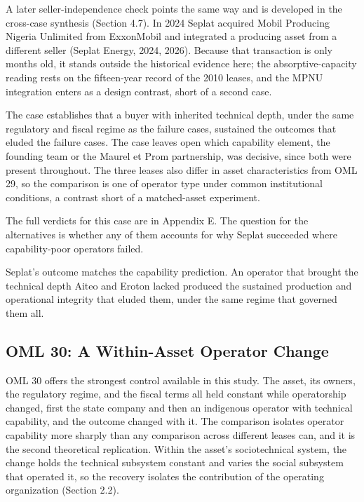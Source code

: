 A later seller-independence check points the same way and is developed
in the cross-case synthesis (Section 4.7). In 2024 Seplat acquired Mobil
Producing Nigeria Unlimited from ExxonMobil and integrated a producing
asset from a different seller (Seplat Energy, 2024, 2026). Because that
transaction is only months old, it stands outside the historical
evidence here; the absorptive-capacity reading rests on the fifteen-year
record of the 2010 leases, and the MPNU integration enters as a design
contrast, short of a second case.

The case establishes that a buyer with inherited technical depth, under
the same regulatory and fiscal regime as the failure cases, sustained
the outcomes that eluded the failure cases. The case leaves open which
capability element, the founding team or the Maurel et Prom partnership,
was decisive, since both were present throughout. The three leases also
differ in asset characteristics from OML 29, so the comparison is one of
operator type under common institutional conditions, a contrast short of
a matched-asset experiment.

The full verdicts for this case are in Appendix E. The question for the
alternatives is whether any of them accounts for why Seplat succeeded
where capability-poor operators failed.

Seplat's outcome matches the capability prediction. An operator that
brought the technical depth Aiteo and Eroton lacked produced the
sustained production and operational integrity that eluded them, under
the same regime that governed them all.

\hypertarget{oml-30-a-within-asset-operator-change}{%
\subsection{OML 30: A Within-Asset Operator
Change}\label{oml-30-a-within-asset-operator-change}}

OML 30 offers the strongest control available in this study. The asset,
its owners, the regulatory regime, and the fiscal terms all held
constant while operatorship changed, first the state company and then an
indigenous operator with technical capability, and the outcome changed
with it. The comparison isolates operator capability more sharply than
any comparison across different leases can, and it is the second
theoretical replication. Within the asset's sociotechnical system, the
change holds the technical subsystem constant and varies the social
subsystem that operated it, so the recovery isolates the contribution of
the operating organization (Section 2.2).

